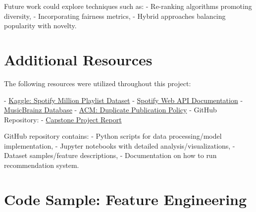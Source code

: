 \documentclass[runningheads]{llncs}
\begin{document}
Future work could explore techniques such as:
- Re-ranking algorithms promoting diversity,
- Incorporating fairness metrics,
- Hybrid approaches balancing popularity with novelty.

\section{Additional Resources}
The following resources were utilized throughout this project:

- \href{https://www.kaggle.com/datasets/shubhendra/million-playlist-dataset}{Kaggle: Spotify Million Playlist Dataset}
- \href{https://developer.spotify.com/documentation/web-api/}{Spotify Web API Documentation}
- \href{https://musicbrainz.org/}{MusicBrainz Database}
- \href{https://www.acm.org/publications/policies/duplicate-publication}{ACM: Duplicate Publication Policy}
- GitHub Repository: 
  - \href{https://github.com/anythonyschomer/Capstone-Project-Report}{Capstone Project Report}

GitHub repository contains:
- Python scripts for data processing/model implementation,
- Jupyter notebooks with detailed analysis/visualizations,
- Dataset samples/feature descriptions,
- Documentation on how to run recommendation system.


 
 






\appendix
\section{Code Sample: Feature Engineering}
\end{document}
